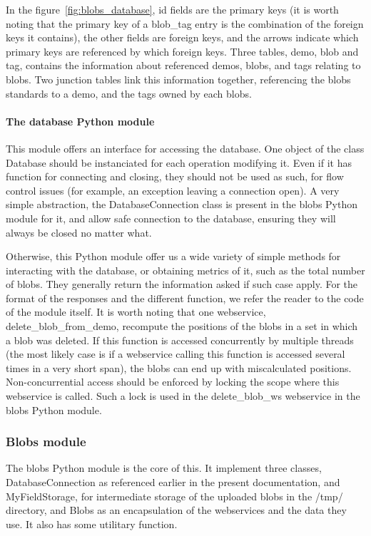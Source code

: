 In the figure~\ref{fig:blobs_database}, id fields are the primary keys (it is worth noting that the primary key of a blob\_tag entry is the combination of the foreign keys it contains), the other fields are foreign keys, and the arrows indicate which primary keys are referenced by which foreign keys.
Three tables, demo, blob and tag, contains the information about referenced demos, blobs, and tags relating to blobs. Two junction tables link this information together, referencing the blobs standards to a demo, and the tags owned by each blobs.

\paragraph{The database Python module\\}
This module offers an interface for accessing the database. One object of the class Database should be instanciated for each operation modifying it. Even if it has function for connecting and closing, they should not be used as such, for flow control issues (for example, an exception leaving a connection open). A very simple abstraction, the DatabaseConnection class is present in the blobs Python module for it, and allow safe connection to the database, ensuring they will always be closed no matter what.

Otherwise, this Python module offer us a wide variety of simple methods for interacting with the database, or obtaining metrics of it, such as the total number of blobs. They generally return the information asked if such case apply. For the format of the responses and the different function, we refer the reader to the code of the module itself. It is worth noting that one webservice, delete\_blob\_from\_demo, recompute the positions of the blobs in a set in which a blob was deleted. If this function is accessed concurrently by multiple threads (the most likely case is if a webservice calling this function is accessed several times in a very short span), the blobs can end up with miscalculated positions. Non-concurrential access should be enforced by locking the scope where this webservice is called. Such a lock is used in the delete\_blob\_ws webservice in the blobs Python module.

\subsubsection{Blobs module}
The blobs Python module is the core of this. It implement three classes, DatabaseConnection as referenced earlier in the present documentation, and MyFieldStorage, for intermediate storage of the uploaded blobs in the /tmp/ directory, and Blobs as an encapsulation of the webservices and the data they use. It also has some utilitary function.

